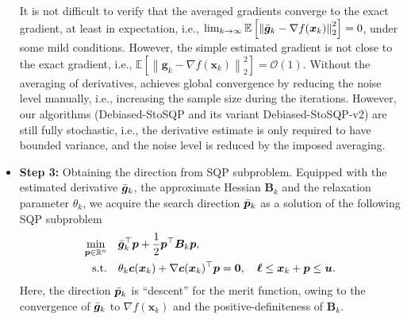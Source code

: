 \documentclass[aos]{imsart}
\numberwithin{equation}{section}
\theoremstyle{plain}
\begin{document}
\begin{itemize}
It is not difficult to verify that the averaged gradients converge to the exact gradient, at least in expectation, i.e., $ \lim_{k \to \infty} \mathbb{E} \left[ \left\| \Bar{\bm{g}}_k - \nabla f(\bm{x}_k)\right\|_2^2 \right] = 0$, under some mild conditions. However, the simple estimated gradient is not close to the exact gradient, i.e., $\mathbb{E} \left[ \left\|  \bm{g}_k - \nabla f(\bm{x}_k)\right\|_2^2 \right] = \mathcal{O}(1)$.
Without the averaging of derivatives, \cite{curtis2023sequential} achieves global convergence by reducing the noise level manually, i.e., increasing the sample size during the iterations. However, our algorithms (Debiased-StoSQP and its variant Debiased-StoSQP-v2) are still fully stochastic, i.e., the derivative estimate is only required to have bounded variance, and the noise level is reduced by the imposed averaging. 

    \item \textbf{Step 3:} Obtaining the direction from SQP subproblem. Equipped with the estimated derivative $\Bar{\bm{g}}_k$, the approximate Hessian $\bm{B}_k$ and the relaxation parameter $\theta_k$, we acquire the search direction $\Bar{\bm{p}}_k$ as a solution of the following SQP subproblem
    \begin{equation}
    \label{relaxed_sqp_subproblem_stoch}
    \begin{split}
        \min_{\bm{p} \in \mathbb{R}^{n}} & \hspace{1em} \Bar{\bm{g}}_k^{\top}\bm{p}+ \frac{1}{2}\bm{p}^{\top}\bm{B}_k\bm{p},\\
        \text{s.t.} & \hspace{1em} \theta_k \bm{c}(\bm{x}_k)+\nabla \bm{c}(\bm{x}_k)^{\top}\bm{p} = \bm{0},\quad \bm{\ell} \leq \bm{x}_k + \bm{p} \leq \bm{u}.
    \end{split}    
\end{equation} 
Here, the direction $\Bar{\bm{p}}_k$ is ``descent'' for the merit function, owing to the convergence of  $\Bar{\bm{g}}_k$ to $\nabla f(\bm{x}_k)$ and the positive-definiteness of $\bm{B}_k$. 
    


\end{itemize}
\end{document}

